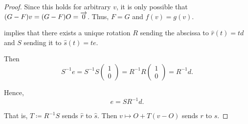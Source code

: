 \begin{proof}
  Since this holds for arbitrary \( v \), it is only possible that \( (G - F) v = (G - F) O = \overrightarrow{0} \). Thus, \( F = G \) and \( f(v) = g(v) \).

  \ExistenceSubProof {} implies that there exists a unique rotation \( R \) sending the abscissa to \( \widehat{r}(t) = td \) and \( S \) sending it to \( \widehat{s}(t) = te \).

  Then
  \begin{equation*}
    S^{-1} e
    =
    S^{-1} S \begin{pmatrix} 1 \\ 0 \end{pmatrix}
    =
    R^{-1} R \begin{pmatrix} 1 \\ 0 \end{pmatrix}
    =
    R^{-1} d.
  \end{equation*}

  Hence,
  \begin{equation*}
    e = S R^{-1} d.
  \end{equation*}

  That is, \( T \coloneqq R^{-1} S \) sends \( \widehat{r} \) to \( \widehat{s} \). Then \( v \mapsto O + T(v - O) \) sends \( r \) to \( s \).
\end{proof}

